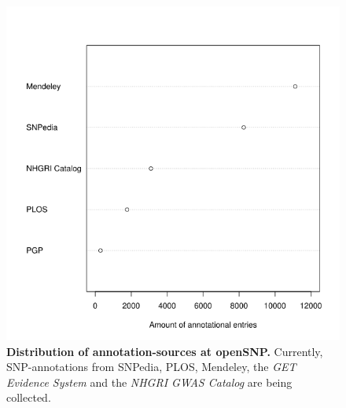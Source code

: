 \documentclass[10pt]{article}
\begin{document}
\begin{figure}[!ht]
	\begin{center}
		\includegraphics[scale=0.5]{25_10_2012_Graphs/papers_dotchart.png}
	\end{center}
	\caption{
	{\bf Distribution of annotation-sources at openSNP.} Currently, SNP-annotations from SNPedia, PLOS, Mendeley, the \emph{GET Evidence System} and the \emph{NHGRI GWAS Catalog} are being collected.}
	\label{Figure3_label}
\end{figure}
\end{document}
